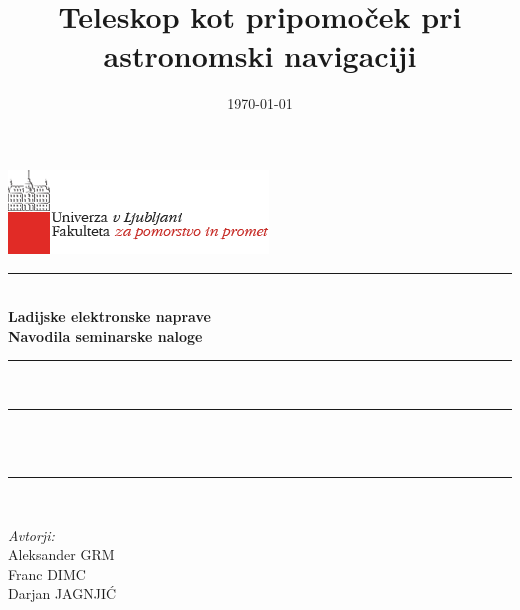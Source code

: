 \documentclass[11pt,a4]{article}
\title{Teleskop kot pripomoček pri astronomski navigaciji}
\date{\today}
\author{}
\makeatletter
\let\thetitle\@title
\let\thedate\@date
\makeatother
\begin{document}

\begin{titlepage}
	\centering
	\vspace*{-2cm}
    \includegraphics[scale = 0.75]{logo_FPP.png}\\[1.0 cm]
    
	\rule{\linewidth}{1 mm} \\[0.4 cm]
	{ \huge \bfseries Ladijske elektronske naprave} \\[0.5 cm]
	{ \Large \bfseries Navodila seminarske naloge}
	\rule{\linewidth}{1 mm} \\[1 cm]
	
	\rule{\linewidth}{0.5 mm} \\[0.4 cm]
	{ \large \bfseries \thetitle}\\[0.0 cm]
	\rule{\linewidth}{0.5 mm} \\[2 cm]
	
	\begin{minipage}{0.4\textwidth}
		\begin{flushleft} \large
			\emph{Avtorji:}\\[0.2 cm]
			Aleksander GRM\\
			Franc DIMC\\
			Darjan JAGNJIĆ
			\end{flushleft}
			\end{minipage}~
			\begin{minipage}{0.4\textwidth}
			\begin{flushright}
			\end{flushright}
	\end{minipage}\\[2 cm]
	
	\vfill
	
	{\large \thedate}\\[2 cm]
 
	
	
\end{titlepage}


\tableofcontents
\pagebreak

\end{document}
